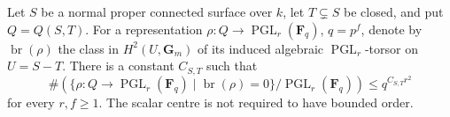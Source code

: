 \begin{theorem}
\label{D:Brauer-zero-projective-representation-growth}
Let $S$ be a normal proper connected surface over $k$,
let $T\subsetneq S$ be closed, and put $Q=Q(S,T)$.
For a representation
$\rho:Q\to\operatorname{PGL}_r(\mathbf F_q)$,
$q=p^f$, denote by $\operatorname{br}(\rho)$ the
class in $H^2(U,\mathbf G_m)$ of its induced
algebraic $\operatorname{PGL}_r$-torsor on $U=S-T$.
There is a constant $C_{S,T}$ such that
\[
 \#\left(
   \{\rho:Q\to\operatorname{PGL}_r(\mathbf F_q)
                   \mid \operatorname{br}(\rho)=0\}
                   /\operatorname{PGL}_r(\mathbf F_q)
    \right)
               \le q^{C_{S,T}r^2}                       \tag{D.BZ.17}
\]
for every $r,f\ge1$.  The scalar centre is not required
to have bounded order.
\end{theorem}

